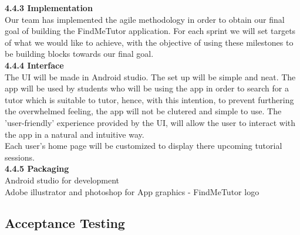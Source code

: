 \documentclass[12pt]{article}
\begin{document}
{\textbf{4.4.3 Implementation}\\
Our team has implemented the agile methodology in order to obtain our final goal of building the FindMeTutor application. For each sprint we will set targets of what we would like to achieve, with the objective of using these milestones to be building blocks towards our final goal.
\\\textbf{4.4.4 Interface}\\
The UI will be made in Android studio. The set up will be simple and neat. The app will be used by students who will be using the app in order to search for a tutor which is suitable to tutor, hence, with this intention, to prevent furthering the overwhelmed feeling, the app will not be clutered and simple to use. The 'user-friendly' experience provided by the UI, will allow the user to interact with the app in a natural and intuitive way. \\
Each user's home page will be customized to display there upcoming tutorial sessions.\\
\textbf{4.4.5 Packaging}\\
Android studio for development\\
Adobe illustrator and photoshop for App graphics - FindMeTutor logo\\
}

\newpage
\subsection{Acceptance Testing}
\end{document}
